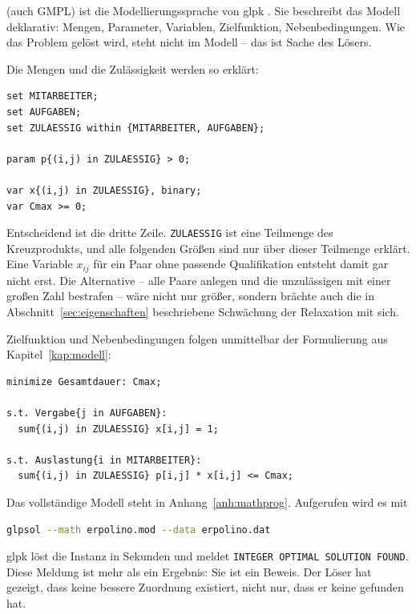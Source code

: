 (auch GMPL) ist die Modellierungssprache von
\ac{glpk} \parencite{glpk}. Sie beschreibt das Modell deklarativ: Mengen,
Parameter, Variablen, Zielfunktion, Nebenbedingungen. Wie das Problem
gelöst wird, steht nicht im Modell -- das ist Sache des Lösers.

Die Mengen und die Zulässigkeit werden so erklärt:

\begin{lstlisting}[language=mathprog,caption={Mengen, Parameter und Variablen},label={lst:modmengen}]
set MITARBEITER;
set AUFGABEN;
set ZULAESSIG within {MITARBEITER, AUFGABEN};

param p{(i,j) in ZULAESSIG} > 0;

var x{(i,j) in ZULAESSIG}, binary;
var Cmax >= 0;
\end{lstlisting}

Entscheidend ist die dritte Zeile. \texttt{ZULAESSIG} ist eine Teilmenge
des Kreuzprodukts, und alle folgenden Größen sind nur über dieser
Teilmenge erklärt. Eine Variable $x_{ij}$ für ein Paar ohne passende
Qualifikation entsteht damit gar nicht erst. Die Alternative -- alle
Paare anlegen und die unzulässigen mit einer großen Zahl bestrafen --
wäre nicht nur größer, sondern brächte auch die in
Abschnitt~\ref{sec:eigenschaften} beschriebene Schwächung der
Relaxation mit sich.

Zielfunktion und Nebenbedingungen folgen unmittelbar der Formulierung
aus Kapitel~\ref{kap:modell}:

\begin{lstlisting}[language=mathprog,caption={Zielfunktion und Nebenbedingungen},label={lst:modnb}]
minimize Gesamtdauer: Cmax;

s.t. Vergabe{j in AUFGABEN}:
  sum{(i,j) in ZULAESSIG} x[i,j] = 1;

s.t. Auslastung{i in MITARBEITER}:
  sum{(i,j) in ZULAESSIG} p[i,j] * x[i,j] <= Cmax;
\end{lstlisting}

Das vollständige Modell steht in Anhang~\ref{anh:mathprog}. Aufgerufen
wird es mit

\begin{lstlisting}[language=bash,numbers=none]
glpsol --math erpolino.mod --data erpolino.dat
\end{lstlisting}

\ac{glpk} löst die Instanz in \MilpSekunden{} Sekunden und meldet
\texttt{INTEGER OPTIMAL SOLUTION FOUND}. Diese Meldung ist mehr als ein
Ergebnis: Sie ist ein Beweis. Der Löser hat gezeigt, dass keine bessere
Zuordnung existiert, nicht nur, dass er keine gefunden hat.

